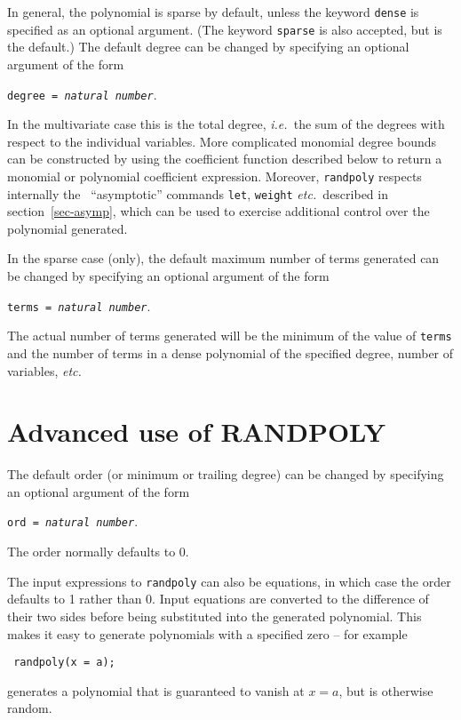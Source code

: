 In general, the polynomial is sparse by default, unless the keyword
{\tt dense} is specified as an optional
argument.  (The keyword {\tt sparse} is
also accepted, but is the default.)  The default degree can be changed
by specifying an optional argument of the form
\begin{center}
  {\tt degree = {\it natural number}}.
\end{center}
In the multivariate case this is the total degree, {\em i.e.\ }the sum of
the degrees with respect to the individual variables.
More complicated monomial degree bounds can be constructed by using
the coefficient function described below to return a monomial or
polynomial coefficient expression.  Moreover, {\tt randpoly} respects
internally the \REDUCE\ ``asymptotic'' commands {\tt let}, {\tt weight}
{\em etc.\ }described in section~\ref{sec-asymp}, which can be used
to exercise additional control over the polynomial generated.

In the sparse case (only), the default maximum number of terms
generated can be changed by specifying an optional argument of the
form
\begin{center}
  {\tt terms = {\it natural number}}.
\end{center}
The actual number of terms generated will be the minimum of the value
of {\tt terms} and the number of terms in a dense polynomial of the
specified degree, number of variables, {\em etc.}


\section{Advanced use of RANDPOLY}

The default order (or minimum or trailing degree) can be changed by
specifying an optional argument of the form
\begin{center}
  {\tt ord = {\it natural number}}.
\end{center}
The order normally defaults to 0.

The input expressions to {\tt randpoly} can also be
equations, in which case the order defaults to 1 rather than 0.  Input
equations are converted to the difference of their two sides before
being substituted into the generated polynomial.  This makes it easy
to generate polynomials with a specified zero -- for example
\begin{center}\tt
  randpoly(x = a);
\end{center}
generates a polynomial that is guaranteed to vanish at $x = a$, but is
otherwise random.

